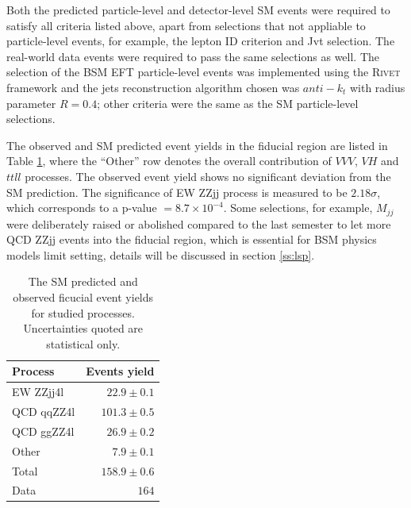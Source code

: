 \documentclass[a4paper,12pt]{article}
\begin{document}
			\par Both the predicted particle-level and detector-level SM events were required to satisfy
			all criteria listed above, apart from selections that not appliable to particle-level events, for example,
			the lepton ID criterion and Jvt selection. The real-world data events were required to pass the same 
			selections as well. The selection of the BSM EFT particle-level events was implemented using the 
			\textsc{Rivet}\cite{Bierlich_2020} framework and the jets reconstruction algorithm chosen was $anti-k_t$\cite{Cacciari_2008} 
			with radius parameter $R=0.4$; other criteria were the same as the SM particle-level selections.
			\par The observed and SM predicted event yields in the fiducial region are listed in Table \ref{tab:fidyield}, where the
			``Other'' row denotes the overall contribution of $VVV$, $VH$ and $ttll$ processes.
			The observed event yield shows no significant deviation from the SM prediction. The significance of EW ZZjj process 
			is measured to be $2.18\sigma$, which corresponds to a p-value $= 8.7\times10^{-4}$. Some selections, for example, 
			$M_{jj}$ were deliberately raised or abolished compared to the last semester\cite{last:2020} to let more QCD 
			ZZjj events into the fiducial region, which is essential for BSM physics models limit setting, 
			details will be discussed in section \ref{ss:lsp}.
			\begin{table}[ht]
				\centering
				\renewcommand{\arraystretch}{1.1}
				\begin{tabularx}{0.5\textwidth}{X r} 
					\hline\hline
					Process 	& 		Events yield \\
					\hline
					EW ZZjj4l   & 		$22.9\pm 0.1$ \\				
					QCD qqZZ4l	&		$101.3\pm 0.5$ \\
					QCD ggZZ4l  & 		$26.9\pm 0.2$ \\
					Other 		& 		$7.9\pm 0.1$ \\
					\hline
					Total		&		$158.9\pm 0.6$\\
					\hline		
					Data		&		$164$ \\
					\hline\hline
				\end{tabularx}
				\caption{The SM predicted and observed ficucial event yields for studied processes. Uncertainties 
				quoted are statistical only.}
				\label{tab:fidyield}
			\end{table}
\end{document}
